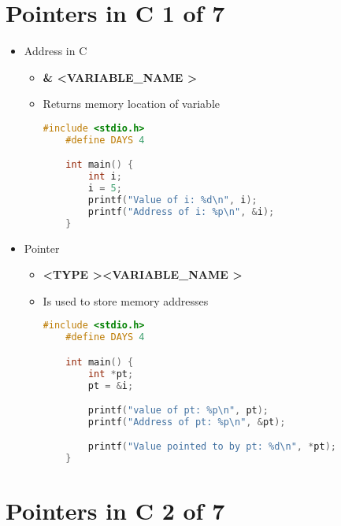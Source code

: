 \documentclass[12pt]{article}
\begin{document}
\bigskip

\section*{Pointers in C 1 of 7}

\bigskip

\begin{itemize}
    \item Address in C
    \begin{itemize}
    \item \textbf{\& \textless VARIABLE\_NAME \textgreater}
    \item Returns memory location of variable

    \begin{lstlisting}[language=c]
    #include <stdio.h>
    #define DAYS 4

    int main() {
        int i;
        i = 5;
        printf("Value of i: %d\n", i);
        printf("Address of i: %p\n", &i);
    }
    \end{lstlisting}

    \end{itemize}
    \item Pointer
    \begin{itemize}
    \item \textbf{\textless TYPE \textgreater* \textless VARIABLE\_NAME \textgreater}
    \item Is used to store memory addresses

    \begin{lstlisting}[language=c]
    #include <stdio.h>
    #define DAYS 4

    int main() {
        int *pt;
        pt = &i;

        printf("value of pt: %p\n", pt);
        printf("Address of pt: %p\n", &pt);

        printf("Value pointed to by pt: %d\n", *pt);
    }
    \end{lstlisting}
    \end{itemize}
\end{itemize}

\bigskip

\section*{Pointers in C 2 of 7}

\bigskip
\end{document}
